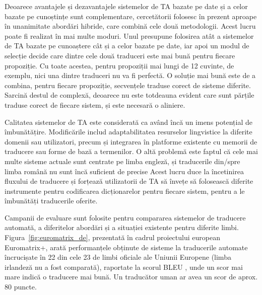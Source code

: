 \documentclass[]{../../metanetpaper}
\begin{document}
\begin{multicols}{2}
Deoarece avantajele și dezavantajele sistemelor de TA bazate pe date și a celor bazate pe cunoștințe sunt complementare, cercetătorii folosesc în prezent aproape în unanimitate abordări hibride, care combină cele două metodologii. Acest lucru poate fi realizat în mai multe moduri. Unul presupune folosirea atât a sistemelor de TA bazate pe cunoaștere cât și a celor bazate pe date, iar apoi un modul de selecție decide care dintre cele două traduceri este mai bună pentru fiecare propoziție. Cu toate acestea, pentru propoziții mai lungi de 12 cuvinte, de exemplu, nici una dintre traduceri nu va fi perfectă. O soluție mai bună este de a combina, pentru fiecare propoziție, secvențele traduse corect de sisteme diferite. Sarcină destul de complexă, deoarece nu este totdeauna evident care sunt părțile traduse corect de fiecare sistem, și este necesară o aliniere. 

Calitatea sistemelor de TA este considerată ca având încă un imens potențial de îmbunătățire. Modificările includ adaptabilitatea resurselor lingvistice la diferite domenii sau utilizatori, precum și integrarea în platforme existente cu memorii de traducere sau forme de bază a termenilor. O altă problemă este faptul că cele mai multe sisteme actuale sunt centrate pe limba engleză, și traducerile din/spre limba română nu sunt încă suficient de precise Acest lucru duce la încetinirea fluxului de traducere și forțează utilizatorii de TA să învețe să folosească diferite instrumente pentru codificarea dicționarelor pentru fiecare sistem, pentru a le îmbunătăți traducerile oferite.

Campanii de evaluare sunt folosite pentru compararea sistemelor de traducere automată, a diferitelor abordări și a situației existente pentru diferite limbi. Figura~\ref{fig:euromatrix_de}, prezentată în cadrul proiectului european Euromatrix+, arată performanțele obținute de sisteme la traducerile automate încrucișate în 22 din cele 23 de limbi oficiale ale Uniunii Europene (limba irlandeză nu a fost comparată), raportate la scorul BLEU \cite{bleu1}, unde un scor mai mare indică o traducere mai bună. Un traducător uman ar avea un scor de aprox. 80 puncte.


\end{multicols}
\end{document}
